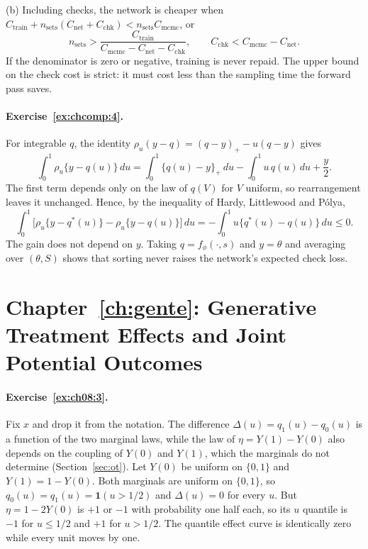 (b) Including checks, the network is cheaper when $C_{\mathrm{train}} + n_{\mathrm{sets}}(C_{\mathrm{net}} + C_{\mathrm{chk}}) < n_{\mathrm{sets}}C_{\mathrm{mcmc}}$, or
\[
n_{\mathrm{sets}} > \frac{C_{\mathrm{train}}}{C_{\mathrm{mcmc}} - C_{\mathrm{net}} - C_{\mathrm{chk}}},
\qquad C_{\mathrm{chk}} < C_{\mathrm{mcmc}} - C_{\mathrm{net}}.
\]
If the denominator is zero or negative, training is never repaid. The upper bound on the check cost is strict: it must cost less than the sampling time the forward pass saves.

\paragraph{Exercise~\ref{ex:chcomp:4}.} For integrable $q$, the identity $\rho_u(y - q) = (q - y)_+ - u(q - y)$ gives
\[
\int_0^1 \rho_u\{y - q(u)\}\,du = \int_0^1 \{q(u) - y\}_+\,du - \int_0^1 u\,q(u)\,du + \frac y2.
\]
The first term depends only on the law of $q(V)$ for $V$ uniform, so rearrangement leaves it unchanged. Hence, by the inequality of Hardy, Littlewood and P\'olya,
\[
\int_0^1 \bigl[\rho_u\{y - q^\ast(u)\} - \rho_u\{y - q(u)\}\bigr]\,du
= -\int_0^1 u\{q^\ast(u) - q(u)\}\,du \le 0.
\]
The gain does not depend on $y$. Taking $q = f_\phi(\cdot, s)$ and $y = \theta$ and averaging over $(\theta, S)$ shows that sorting never raises the network's expected check loss.

\section*{Chapter~\ref{ch:gente}: Generative Treatment Effects and Joint Potential Outcomes}

\paragraph{Exercise~\ref{ex:ch08:3}.} Fix $x$ and drop it from the notation. The difference $\Delta(u) = q_1(u) - q_0(u)$ is a function of the two marginal laws, while the law of $\eta = Y(1) - Y(0)$ also depends on the coupling of $Y(0)$ and $Y(1)$, which the marginals do not determine (Section~\ref{sec:ot}). Let $Y(0)$ be uniform on $\{0, 1\}$ and $Y(1) = 1 - Y(0)$. Both marginals are uniform on $\{0, 1\}$, so $q_0(u) = q_1(u) = \mathbf{1}(u > 1/2)$ and $\Delta(u) = 0$ for every $u$. But $\eta = 1 - 2Y(0)$ is $+1$ or $-1$ with probability one half each, so its $u$ quantile is $-1$ for $u \le 1/2$ and $+1$ for $u > 1/2$. The quantile effect curve is identically zero while every unit moves by one. 

